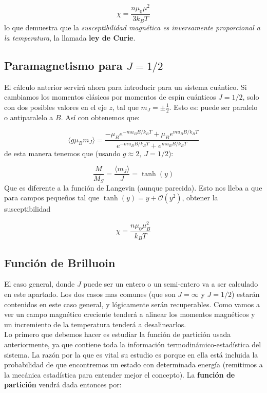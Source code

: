 \documentclass[12pt,a4paper]{book}
\numberwithin{equation}{section}
\numberwithin{figure}{section}
\begin{document}
\begin{equation}
\chi = \frac{n \mu_0 \mu^2}{3 k_B T}
\end{equation}
lo que demuestra que la \textit{susceptibilidad magnética es inversamente proporcional a la temperatura}, la llamada \textbf{ley de Curie}. 

\subsection{Paramagnetismo para $J=1/2$}

El cálculo anterior servirá ahora para introducir para un sistema cuántico. Si cambiamos los momentos clásicos por momentos de espín cuánticos $J=1/2$, solo con dos posibles valores en el eje $z$, tal que $m_J = \pm \frac{1}{2}$. Esto es: puede ser paralelo o antiparalelo a $B$. Así con obtenemos que:

\begin{equation}
\langle g \mu_B m_J \rangle = \frac{- \mu_B e^{-mu_B B / k_B T}+\mu_B e^{mu_B B / k_B T}}{e^{-mu_B B / k_B T}+e^{mu_B B / k_B T}}
\end{equation}
de esta manera tenemos que (usando $g \approx 2, \ J=1/2$):

\begin{equation}
\frac{M}{M_S} = \frac{\langle m_J \rangle}{J} = \tanh (y)
\end{equation}
Que es diferente a la función de Langevin (aunque parecida). Esto nos lleba a que para campos pequeños tal que $\tanh (y) = y + \mathcal{O}(y^2)$, obtener la susceptibilidad

\begin{equation}
\chi = \frac{n \mu_0 \mu_B^2}{k_B T}
\end{equation}

\subsection{Función de Brilluoin}

El caso general, donde $J$ puede ser un entero o un semi-entero va a ser calculado en este apartado. Los dos casos mas comunes (que son $J = \infty$ y $J=1/2$) estarán contenidos en este caso general, y lógicamente serán recuperables. Como vamos a ver un campo magnético creciente tenderá a alinear los momentos magnéticos y un incremiento de la temperatura tenderá a desalinearlos. \\

Lo primero que debemos hacer es estudiar la función de partición usada anteriormente, ya que contiene toda la información termodinámico-estadística del sistema. La razón por la que es vital su estudio es porque en ella está incluida la probabilidad de que encontremos un estado con determinada energía (remitimos a la mecánica estadística para entender mejor el concepto). La \textbf{función de partición} vendrá dada entonces por:
\end{document}
